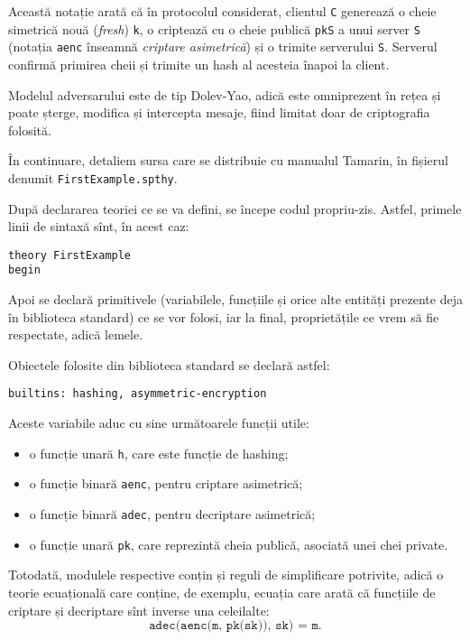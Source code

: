 Această notație arată că în protocolul considerat, clientul
\texttt{C} generează o cheie simetrică nouă (\emph{fresh}) \texttt{k},
o criptează cu o cheie publică \texttt{pkS} a unui server \texttt{S}
(notația \texttt{aenc} înseamnă \emph{criptare asimetrică}) și o
trimite serverului \texttt{S}. Serverul confirmă primirea cheii și
trimite un hash al acesteia înapoi la client.

Modelul adversarului este de tip Dolev-Yao, adică este omniprezent
în rețea și poate șterge, modifica și intercepta mesaje, fiind limitat
doar de criptografia folosită.

În continuare, detaliem sursa care se distribuie cu manualul Tamarin,
în fișierul denumit \texttt{FirstExample.spthy}.

După declararea teoriei ce se va defini, se începe codul propriu-zis.
Astfel, primele linii de sintaxă sînt, în acest caz:

\begin{verbatim}
theory FirstExample
begin
\end{verbatim}

Apoi se declară primitivele (variabilele, funcțiile și orice alte entități
prezente deja în biblioteca standard) ce se vor folosi, iar la final,
proprietățile ce vrem să fie respectate, adică lemele.

Obiectele folosite din biblioteca standard se declară astfel:

\begin{verbatim}
builtins: hashing, asymmetric-encryption
\end{verbatim}

Aceste variabile aduc cu sine următoarele funcții utile:
\begin{itemize}
\item o funcție unară \texttt{h}, care este funcție de hashing;
\item o funcție binară \texttt{aenc}, pentru criptare asimetrică;
\item o funcție binară \texttt{adec}, pentru decriptare asimetrică;
\item o funcție unară \texttt{pk}, care reprezintă cheia publică, asociată
  unei chei private.
\end{itemize}

Totodată, modulele respective conțin și reguli de simplificare potrivite,
adică o teorie ecuațională care conține, de exemplu, ecuația care arată
că funcțiile de criptare și decriptare sînt inverse una celeilalte:
\[
  \texttt{adec(aenc(m, pk(sk)), sk) = m}.
\]

